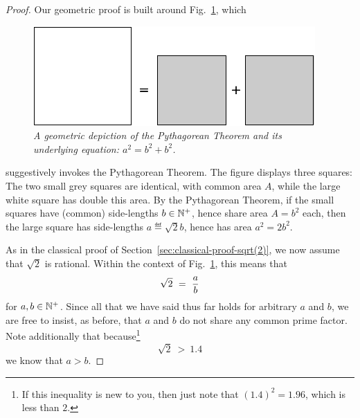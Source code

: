 \begin{proof}
Our geometric proof is built around Fig.~\ref{fig:irrationality1}, which
\begin{figure}[htb]
\begin{center}
       \includegraphics[scale=0.4]{FiguresArithmetic/sqrt2initial}
\caption{{\it A geometric depiction of the Pythagorean Theorem and its
    underlying equation: $a^2 = b^2 + b^2$.}
\label{fig:irrationality1}}
\end{center}
\end{figure}
suggestively invokes the Pythagorean Theorem.  The figure displays three squares: The two small grey squares are identical, with common area $A$, while the large white square has double this area.  By the Pythagorean Theorem, if the small squares have (common) side-lengths $b \in \mathbb{N}^+$, hence share area $A = b^2$ each, then the large square has side-lengths $a \eqdef \sqrt{2}b$, hence has area $a^2 = 2 b^2$.

As in the classical proof of Section~\ref{sec:classical-proof-sqrt(2)}, we now assume that $\sqrt{2}$ is rational.  Within the context of Fig.~\ref{fig:irrationality1}, this means that
\[ \sqrt{2} \ = \ {a \over b} \]
for $a, b \in \mathbb{N}^+$.  Since all that we have said thus far holds for arbitrary $a$ and $b$, we are free to insist, as before, that $a$ and $b$ do not share any common prime factor.  Note additionally that because\footnote{If this inequality is new to you, then just note that $(1.4)^2 = 1.96$, which is less than $2$.}
\[ \sqrt{2} \ > \ 1.4 \]
we know that $a > b$.

\bigskip

\noindent {}
\bigskip


\end{proof}

